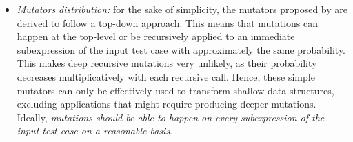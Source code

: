 \documentclass[sigconf,review,anonymous]{acmart}
\newcommand{\fuzzchick}{\textit{FuzzChick}\xspace}
\begin{document}
\begin{itemize}
\item \emph{Mutators distribution:}
%
for the sake of simplicity, the mutators proposed by
\citeauthor{lampropoulos2019coverage} are derived to follow a top-down approach.
%
This means that mutations can happen at the top-level or be recursively applied
to an immediate subexpression of the input test case with approximately the same
probability.
%
%
This makes deep recursive mutations very unlikely, as their probability
decreases multiplicatively with each recursive call.
%
%
%
Hence, these simple mutators can only be effectively used to transform shallow
data structures, excluding applications that might require producing deeper
mutations.
%
%
Ideally, \emph{mutations should be able to happen on every subexpression of the
  input test case on a reasonable basis}.


%



\end{itemize}
\end{document}
